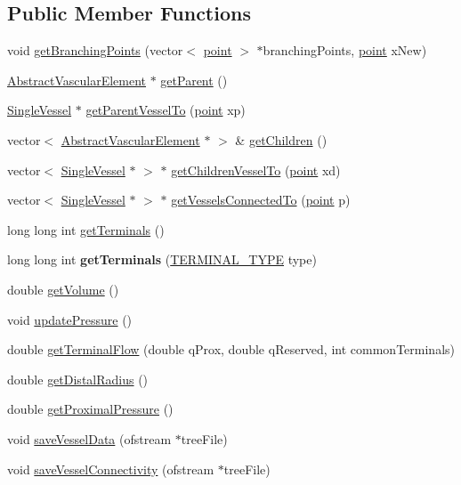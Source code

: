 \subsection*{Public Member Functions}
\begin{DoxyCompactItemize}
\item 
void \hyperlink{class_single_vessel_a6e397458482fd04bc3c1514eb518f05b}{get\+Branching\+Points} (vector$<$ \hyperlink{structpoint}{point} $>$ $\ast$branching\+Points, \hyperlink{structpoint}{point} x\+New)
\item 
\hyperlink{class_abstract_vascular_element}{Abstract\+Vascular\+Element} $\ast$ \hyperlink{class_single_vessel_a7b905db74d4f733ea3cdb86ec961e9d1}{get\+Parent} ()
\item 
\hyperlink{class_single_vessel}{Single\+Vessel} $\ast$ \hyperlink{class_single_vessel_a25b7df0247aea7a482566de82c56ff3f}{get\+Parent\+Vessel\+To} (\hyperlink{structpoint}{point} xp)
\item 
vector$<$ \hyperlink{class_abstract_vascular_element}{Abstract\+Vascular\+Element} $\ast$ $>$ \& \hyperlink{class_single_vessel_a982d61ce4b6025bc07a4ccc95e1acc9f}{get\+Children} ()
\item 
vector$<$ \hyperlink{class_single_vessel}{Single\+Vessel} $\ast$ $>$ $\ast$ \hyperlink{class_single_vessel_a159e7d2d69cd3cae7b26f2ca374da817}{get\+Children\+Vessel\+To} (\hyperlink{structpoint}{point} xd)
\item 
vector$<$ \hyperlink{class_single_vessel}{Single\+Vessel} $\ast$ $>$ $\ast$ \hyperlink{class_single_vessel_a42b2be50278e2c5ffe63d013b17e9713}{get\+Vessels\+Connected\+To} (\hyperlink{structpoint}{point} p)
\item 
long long int \hyperlink{class_single_vessel_a91a1cfd8cae1063b268cf1794859a245}{get\+Terminals} ()
\item 
long long int {\bfseries get\+Terminals} (\hyperlink{class_abstract_vascular_element_a9c7d6ae9fe8c220ddad143208b0a5a11}{T\+E\+R\+M\+I\+N\+A\+L\+\_\+\+T\+Y\+PE} type)\hypertarget{class_single_vessel_ab9802f20fabbb352c91a3082980e543c}{}\label{class_single_vessel_ab9802f20fabbb352c91a3082980e543c}

\item 
double \hyperlink{class_single_vessel_ac2cb07695080b9c7c6da65a2d52e0a51}{get\+Volume} ()
\item 
void \hyperlink{class_single_vessel_adb7b986bc0da45d0720caf08989e00ce}{update\+Pressure} ()
\item 
double \hyperlink{class_single_vessel_ac50e2a301750d3e6c64fa3e5fc37f79e}{get\+Terminal\+Flow} (double q\+Prox, double q\+Reserved, int common\+Terminals)
\item 
double \hyperlink{class_single_vessel_a934c1d6b9a590621d53d78fedfed4c30}{get\+Distal\+Radius} ()
\item 
double \hyperlink{class_single_vessel_a439762c206fe749024ecc8c601d51738}{get\+Proximal\+Pressure} ()
\item 
void \hyperlink{class_single_vessel_a11c4b9cfc4248dafda09d6a3ab8a60c7}{save\+Vessel\+Data} (ofstream $\ast$tree\+File)
\item 
void \hyperlink{class_single_vessel_a84bfe24d24716e35cc1b811eea2a6ec8}{save\+Vessel\+Connectivity} (ofstream $\ast$tree\+File)
\end{DoxyCompactItemize}
